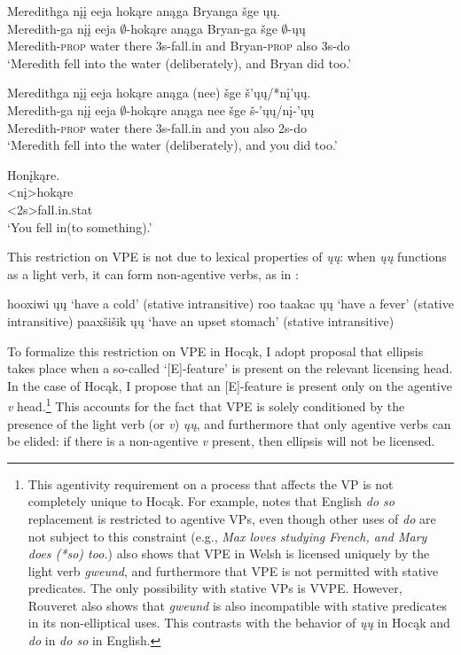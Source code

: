 \documentclass[output=paper]{LSP/langsci}
\begin{document}
\ea\label{ex:johnson:21}
\ea\label{ex:johnson:21a} 
\glll Meredithga nįį eeja hokąre anąga Bryanga šge ųų.\\
Meredith-ga nįį eeja $\emptyset$-hokąre anąga Bryan-ga šge $\emptyset$-ųų\\
Meredith-\textsc{prop} water there {\textsc 3s}-fall.in and Bryan-\textsc{prop} also {\textsc 3s}-do\\
\trans `Meredith fell into the water (deliberately), and Bryan did too.'
 
\ex\label{ex:johnson:21b} 
\glll Meredithga nįį eeja hokąre anąga (nee) šge š'ųų/*nį'ųų.\\
Meredith-ga nįį eeja $\emptyset$-hokąre anąga nee šge š-'ųų/nį-'ųų\\
Meredith-\textsc{prop} water there {\textsc 3s}-fall.in and you also {\textsc 2s}-do\\
\trans `Meredith fell into the water (deliberately), and you did too.'
\z
\z
 
\ea\label{ex:johnson:22} 
\glll Honįkąre.\\
<nį>hokąre\\
<{\textsc 2s}>fall.in.{\textsc stat}\\
\trans `You fell in(to something).' \citep{Hartmann2012}
\z
	
This restriction on VPE is not due to lexical properties of \emph{ųų}: when \emph{ųų} functions as a light verb, it can form non-agentive verbs, as in :

 
\ea\label{ex:johnson:23}
\ea 
hooxiwi ųų `have a cold' (stative intransitive)
\vspace{12pt}
\ex 
roo taakac ųų `have a fever' (stative intransitive)
\vspace{12pt}
\ex 
paaxšišik ųų `have an upset stomach' (stative intransitive)\\
\citep{Hartmann2012}
\z
\z

To formalize this restriction on VPE in Hocąk, I adopt  proposal that ellipsis takes place when a so-called `[E]-feature' is present on the relevant licensing head. In the case of Hocąk, I propose that an [E]-feature is present only on the agentive \emph{v} head.\footnote{This agentivity requirement on a process that affects the VP is not completely unique to Hocąk. For example, \citet{Hallman2004} notes that English \emph{do so} replacement is restricted to agentive VPs, even though other uses of \emph{do} are not subject to this constraint (e.g., \emph{Max loves studying French, and Mary does (*so) too.}) \citet{Rouveret2012} also shows that VPE in Welsh is licensed uniquely by the light verb \emph{gweund}, and furthermore that VPE is not permitted with stative predicates. The only possibility with stative VPs is VVPE. However, Rouveret also shows that \emph{gweund} is also incompatible with stative predicates in its non-elliptical uses. This contrasts with the behavior of \emph{ųų} in Hocąk and \emph{do} in \emph{do so} in English.}  This accounts for the fact that VPE is solely conditioned by the presence of the light verb (or \emph{v}) \emph{ųų}, and furthermore that only agentive verbs can be elided: if there is a non-agentive \emph{v} present, then ellipsis will not be licensed. 
\end{document}
